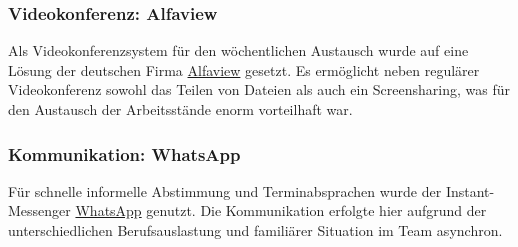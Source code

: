 \subsubsection*{Videokonferenz: Alfaview}

Als Videokonferenzsystem für den wöchentlichen Austausch wurde auf eine Lösung der deutschen Firma \href{https://alfaview.com}{Alfaview} gesetzt. Es ermöglicht neben regulärer Videokonferenz sowohl das Teilen von Dateien als auch ein Screensharing, was für den Austausch der Arbeitsstände enorm vorteilhaft war. 

\subsubsection*{Kommunikation: WhatsApp}

Für schnelle informelle Abstimmung und Terminabsprachen wurde der Instant-Messenger \href{https://whatsapp.com}{WhatsApp} genutzt. Die Kommunikation erfolgte hier aufgrund der unterschiedlichen Berufsauslastung und familiärer Situation im Team asynchron. 





